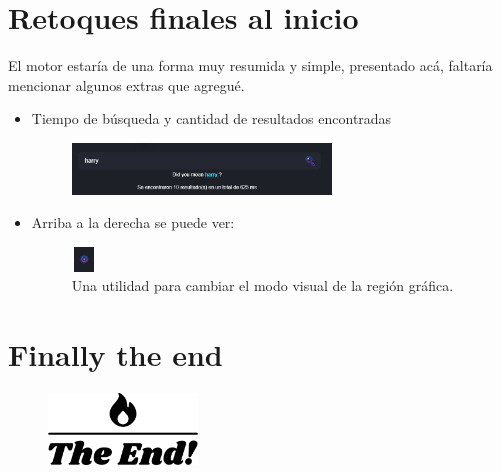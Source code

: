 \renewcommand*{\figurename}{Dato}
\section*{Retoques finales al inicio}
\begin{frame}
    El motor estaría de una forma muy resumida y simple, presentado acá, faltaría mencionar algunos extras que agregué.
    \begin{itemize}
        \item Tiempo de búsqueda y cantidad de resultados encontradas
        \begin{figure}
            \centering
            \includegraphics[width=260px]{Assets/time_results.png}
        \end{figure}
        \item Arriba a la derecha se puede ver:
        \begin{figure}
            \includegraphics[height=25px, width=25px]{Assets/mode.png}
            \caption{Una utilidad para cambiar el modo visual de la región gráfica.}
        \end{figure}
    \end{itemize}
\end{frame}

\section*{Finally the end}
\begin{frame}
    \begin{figure}
        \centering
        \includegraphics[width=150px]{Assets/the_end.png}
    \end{figure}
\end{frame}